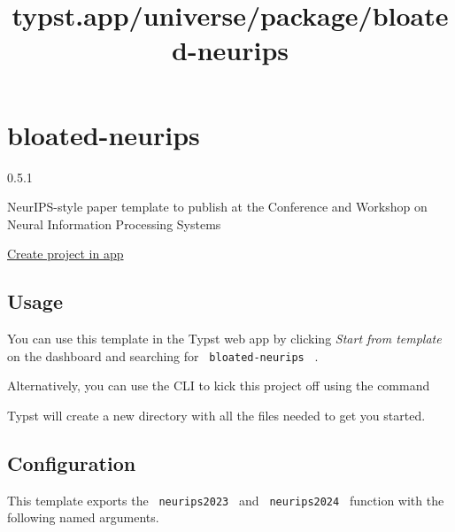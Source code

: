 \title{typst.app/universe/package/bloated-neurips}

\label{banner}
\label{template-thumbnail}

\section{bloated-neurips}\label{bloated-neurips}

{ 0.5.1 }

NeurIPS-style paper template to publish at the Conference and Workshop
on Neural Information Processing Systems

\href{/app?template=bloated-neurips&version=0.5.1}{Create project in
app}

\label{readme}
\subsection{Usage}\label{usage}

You can use this template in the Typst web app by clicking \emph{Start
from template} on the dashboard and searching for
\texttt{\ bloated-neurips\ } .

Alternatively, you can use the CLI to kick this project off using the
command

\begin{Shaded}
\begin{Highlighting}[]
\end{Highlighting}
\end{Shaded}

Typst will create a new directory with all the files needed to get you
started.

\subsection{Configuration}\label{configuration}

This template exports the \texttt{\ neurips2023\ } and
\texttt{\ neurips2024\ } function with the following named arguments.

